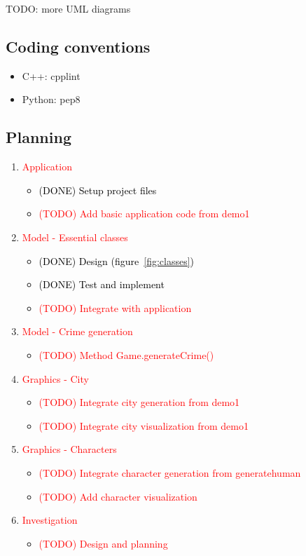 \documentclass[a4paper, twoside]{article}
\begin{document}
TODO: more UML diagrams

\newpage

\subsection{Coding conventions}

\begin{itemize}
	\item{} C++: cpplint
	\item{} Python: pep8
\end{itemize}

\newpage

\subsection{Planning}

\begin{enumerate}
	\item{} \textcolor{red}{Application} \begin{itemize}
		\item{} \textcolor{black}{(DONE) Setup project files}
		\item{} \textcolor{red}{(TODO) Add basic application code from demo1}
	\end{itemize}
	\item{} \textcolor{red}{Model - Essential classes} \begin{itemize}
		\item{} \textcolor{black}{(DONE) Design (figure~\ref{fig:classes})}
		\item{} \textcolor{black}{(DONE) Test and implement}
		\item{} \textcolor{red}{(TODO) Integrate with application}
	\end{itemize}
	\item{} \textcolor{red}{Model - Crime generation} \begin{itemize}
		\item{} \textcolor{red}{(TODO) Method Game.generateCrime()}
	\end{itemize}
	\item{} \textcolor{red}{Graphics - City} \begin{itemize}
		\item{} \textcolor{red}{(TODO) Integrate city generation from demo1}
		\item{} \textcolor{red}{(TODO) Integrate city visualization from demo1}
	\end{itemize}
	\item{} \textcolor{red}{Graphics - Characters} \begin{itemize}
		\item{} \textcolor{red}{(TODO) Integrate character generation from generatehuman}
		\item{} \textcolor{red}{(TODO) Add character visualization}
	\end{itemize}
	\item{} \textcolor{red}{Investigation} \begin{itemize}
		\item{} \textcolor{red}{(TODO) Design and planning}
	\end{itemize}
\end{enumerate}
\end{document}

